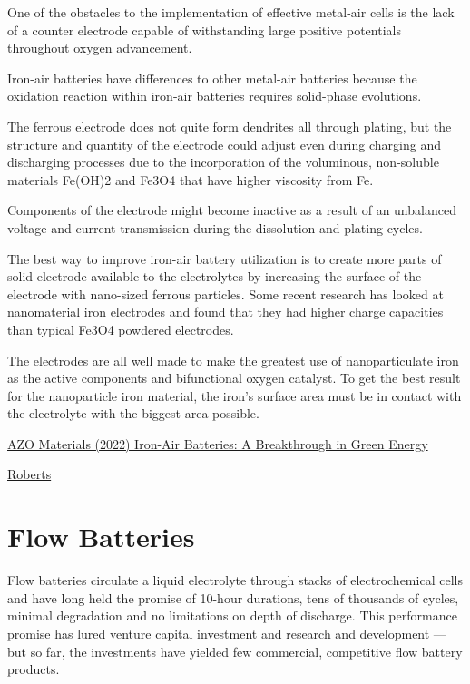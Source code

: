 \documentclass[
]{book}
\begin{document}
One of the obstacles to the implementation of effective metal-air cells is the lack of a counter electrode capable of withstanding large positive potentials throughout oxygen advancement.

Iron-air batteries have differences to other metal-air batteries because the oxidation reaction within iron-air batteries requires solid-phase evolutions.

The ferrous electrode does not quite form dendrites all through plating, but the structure and quantity of the electrode could adjust even during charging and discharging processes due to the incorporation of the voluminous, non-soluble materials Fe(OH)2 and Fe3O4 that have higher viscosity from Fe.

Components of the electrode might become inactive as a result of an unbalanced voltage and current transmission during the dissolution and plating cycles.

The best way to improve iron-air battery utilization is to create more parts of solid electrode available to the electrolytes by increasing the surface of the electrode with nano-sized ferrous particles. Some recent research has looked at nanomaterial iron electrodes and found that they had higher charge capacities than typical Fe3O4 powdered electrodes.

The electrodes are all well made to make the greatest use of nanoparticulate iron as the active components and bifunctional oxygen catalyst. To get the best result for the nanoparticle iron material, the iron's surface area must be in contact with the electrolyte with the biggest area possible.

\href{https://www.azom.com/article.aspx?ArticleID=20872}{AZO Materials (2022) Iron-Air Batteries: A Breakthrough in Green Energy}

\href{https://www.volts.wtf/p/the-ongoing-battle-among-lithium}{Roberts}

\hypertarget{flow-batteries}{%
\section{Flow Batteries}\label{flow-batteries}}

Flow batteries circulate a liquid electrolyte through stacks of electrochemical cells and have long held the promise of 10-hour durations, tens of thousands of cycles, minimal degradation and no limitations on depth of discharge. This performance promise has lured venture capital investment and research and development --- but so far, the investments have yielded few commercial, competitive flow battery products.
\end{document}
